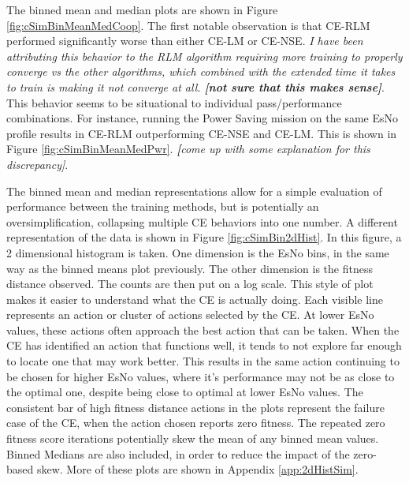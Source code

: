 \par The binned mean and median plots are shown in Figure \ref{fig:cSimBinMeanMedCoop}. The first notable observation is that CE-RLM performed significantly worse than either CE-LM or CE-NSE. \textit{I have been attributing this behavior to the RLM algorithm requiring more training to properly converge vs the other algorithms, which combined with the extended time it takes to train is making it not converge at all. \textbf{[not sure that this makes sense]}}. This behavior seems to be situational to individual pass/performance combinations. For instance, running the Power Saving mission on the same EsNo profile results in CE-RLM outperforming CE-NSE and CE-LM. This is shown in Figure \ref{fig:cSimBinMeanMedPwr}. \textit{\textbf[come up with some explanation for this discrepancy]}.  

\par The binned mean and median representations allow for a simple evaluation of performance between the training methods, but is potentially an oversimplification, collapsing multiple CE behaviors into one number. A different representation of the data is shown in Figure \ref{fig:cSimBin2dHist}. In this figure, a 2 dimensional histogram is taken. One dimension is the EsNo bins, in the same way as the binned means plot previously. The other dimension is the fitness distance observed. The counts are then put on a log scale. This style of plot makes it easier to understand what the CE is actually doing. Each visible line represents an action or cluster of actions selected by the CE. At lower EsNo values, these actions often approach the best action that can be taken. When the CE has identified an action that functions well, it tends to not explore far enough to locate one that may work better. This results in the same action continuing to be chosen for higher EsNo values, where it's performance may not be as close to the optimal one, despite being close to optimal at lower EsNo values. The consistent bar of high fitness distance actions in the plots represent the failure case of the CE, when the action chosen reports zero fitness. The repeated zero fitness score iterations potentially skew the mean of any binned mean values. Binned Medians are also included, in order to reduce the impact of the zero-based skew. More of these plots are shown in Appendix \ref{app:2dHistSim}.

